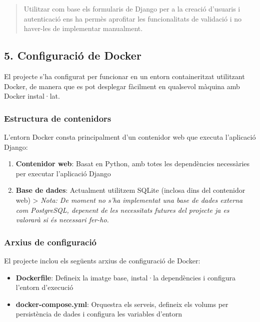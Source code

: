 \begin{quote}
Utilitzar com base els formularis de Django per a la creació d'usuaris i
autenticació ens ha permès aprofitar les funcionalitats de validació i
no haver-les de implementar manualment.
\end{quote}

\hypertarget{configuraciuxf3-de-docker}{%
\subsection{5. Configuració de Docker}\label{configuraciuxf3-de-docker}}

El projecte s'ha configurat per funcionar en un entorn containeritzat
utilitzant Docker, de manera que es pot desplegar fàcilment en qualsevol
màquina amb Docker instal·lat.

\hypertarget{estructura-de-contenidors}{%
\subsubsection{Estructura de
contenidors}\label{estructura-de-contenidors}}

L'entorn Docker consta principalment d'un contenidor web que executa
l'aplicació Django:

\begin{enumerate}
\def\labelenumi{\arabic{enumi}.}
\tightlist
\item
  \textbf{Contenidor web}: Basat en Python, amb totes les dependències
  necessàries per executar l'aplicació Django
\item
  \textbf{Base de dades}: Actualment utilitzem SQLite (inclosa dins del
  contenidor web) \textgreater{} \emph{Nota: De moment no s'ha
  implementat una base de dades externa com PostgreSQL, depenent de les
  necessitats futures del projecte ja es valorarà si és necessari
  fer-ho.}
\end{enumerate}

\hypertarget{arxius-de-configuraciuxf3}{%
\subsubsection{Arxius de configuració}\label{arxius-de-configuraciuxf3}}

El projecte inclou els següents arxius de configuració de Docker:

\begin{itemize}
\tightlist
\item
  \textbf{Dockerfile}: Defineix la imatge base, instal·la dependències i
  configura l'entorn d'execució
\item
  \textbf{docker-compose.yml}: Orquestra els serveis, defineix els
  volums per persistència de dades i configura les variables d'entorn
\end{itemize}

